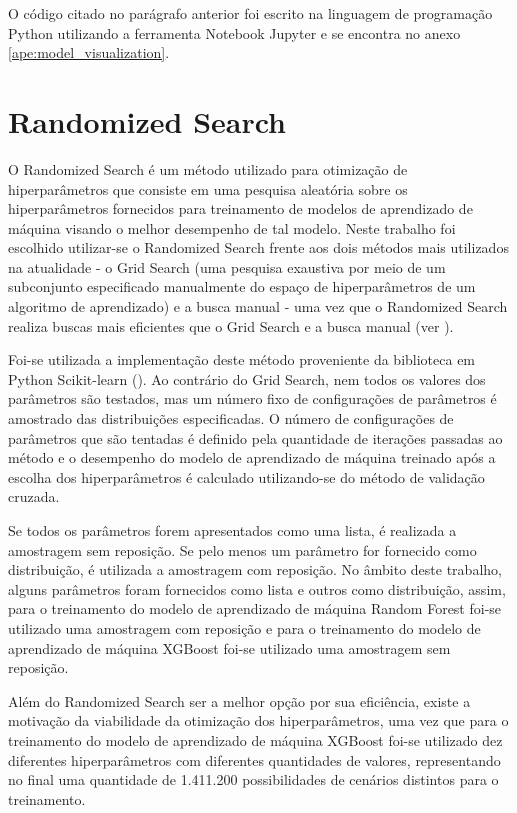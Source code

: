 O código citado no parágrafo anterior foi escrito na linguagem de programação Python utilizando a ferramenta Notebook Jupyter e se encontra no anexo \ref{ape:model_visualization}.

\section{Randomized Search}
\label{sec:randomized_search}

O Randomized Search é um método utilizado para otimização de hiperparâmetros que consiste em uma pesquisa aleatória sobre os hiperparâmetros fornecidos para treinamento de modelos de aprendizado de máquina visando o melhor desempenho de tal modelo. Neste trabalho foi escolhido utilizar-se o Randomized Search frente aos dois métodos mais utilizados na atualidade - o Grid Search (uma pesquisa exaustiva por meio de um subconjunto especificado manualmente do espaço de hiperparâmetros de um algoritmo de aprendizado) e a busca manual - uma vez que o Randomized Search realiza buscas mais eficientes que o Grid Search e a busca manual (ver \citet{Bergstra2012}).

Foi-se utilizada a implementação deste método proveniente da biblioteca em Python Scikit-learn (\citet{Sklearn}). Ao contrário do Grid Search, nem todos os valores dos parâmetros são testados, mas um número fixo de configurações de parâmetros é amostrado das distribuições especificadas. O número de configurações de parâmetros que são tentadas é definido pela quantidade de iterações passadas ao método e o desempenho do modelo de aprendizado de máquina treinado após a escolha dos hiperparâmetros é calculado utilizando-se do método de validação cruzada.

Se todos os parâmetros forem apresentados como uma lista, é realizada a amostragem sem reposição. Se pelo menos um parâmetro for fornecido como distribuição, é utilizada a amostragem com reposição. No âmbito deste trabalho, alguns parâmetros foram fornecidos como lista e outros como distribuição, assim, para o treinamento do modelo de aprendizado de máquina Random Forest foi-se utilizado uma amostragem com reposição e para o treinamento do modelo de aprendizado de máquina XGBoost foi-se utilizado uma amostragem sem reposição.

Além do Randomized Search ser a melhor opção por sua eficiência, existe a motivação da viabilidade da otimização dos hiperparâmetros, uma vez que para o treinamento do modelo de aprendizado de máquina XGBoost foi-se utilizado dez diferentes hiperparâmetros com diferentes quantidades de valores, representando no final uma quantidade de 1.411.200 possibilidades de cenários distintos para o treinamento.

